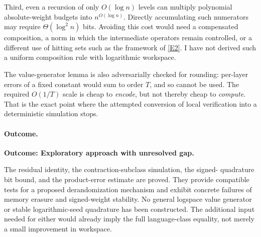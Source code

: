 \documentclass[11pt,a4paper]{article}
\newcommand{\eref}[2]{\hyperlink{extra:#1:#2}{[E#2]}}
\numberwithin{equation}{section}
\begin{document}
Third, even a recursion of only $O(\log n)$ levels can multiply
polynomial absolute-weight budgets into $n^{O(\log n)}$. Directly
accumulating such numerators may require $\Theta(\log^2 n)$ bits.
Avoiding this cost would need a compensated composition, a norm in which
the intermediate operators remain controlled, or a different use of
hitting sets such as the framework of \eref{163}{2}. I have not derived
such a uniform composition rule with logarithmic workspace.

The value-generator lemma is also adversarially checked for rounding:
per-layer errors of a fixed constant would sum to order $T$, and so
cannot be used. The required $O(1/T)$ scale is cheap to \emph{encode},
but not thereby cheap to \emph{compute}. That is the exact point where
the attempted conversion of local verification into a deterministic
simulation stops.

\paragraph{Outcome.}
\textbf{Outcome: Exploratory approach with unresolved gap.}

The residual identity, the contraction-subclass simulation, the signed-
quadrature bit bound, and the product-error estimate are proved. They
provide compatible tests for a proposed derandomization mechanism and
exhibit concrete failures of memory erasure and signed-weight stability.
No general logspace value generator or stable logarithmic-seed quadrature
has been constructed. The additional input needed for either would
already imply the full language-class equality, not merely a small
improvement in workspace.

\end{document}
